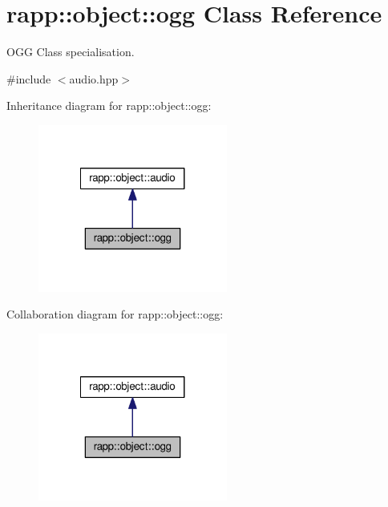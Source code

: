 \hypertarget{classrapp_1_1object_1_1ogg}{\section{rapp\-:\-:object\-:\-:ogg Class Reference}
\label{classrapp_1_1object_1_1ogg}
}


O\-G\-G Class specialisation.  




{\ttfamily \#include $<$audio.\-hpp$>$}



Inheritance diagram for rapp\-:\-:object\-:\-:ogg\-:
\nopagebreak
\begin{figure}[H]
\begin{center}
\leavevmode
\includegraphics[width=176pt]{classrapp_1_1object_1_1ogg__inherit__graph}
\end{center}
\end{figure}


Collaboration diagram for rapp\-:\-:object\-:\-:ogg\-:
\nopagebreak
\begin{figure}[H]
\begin{center}
\leavevmode
\includegraphics[width=176pt]{classrapp_1_1object_1_1ogg__coll__graph}
\end{center}
\end{figure}
